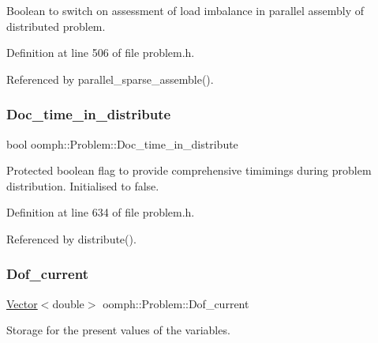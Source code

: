 Boolean to switch on assessment of load imbalance in parallel assembly of distributed problem. 



Definition at line 506 of file problem.\+h.



Referenced by parallel\+\_\+sparse\+\_\+assemble().

\mbox{\label{classoomph_1_1Problem_a524b68efcaae084ad7144f944cb39c69}} 
\subsubsection{\texorpdfstring{Doc\+\_\+time\+\_\+in\+\_\+distribute}{Doc\_time\_in\_distribute}}
{\footnotesize\ttfamily bool oomph\+::\+Problem\+::\+Doc\+\_\+time\+\_\+in\+\_\+distribute\hspace{0.3cm}{\ttfamily [protected]}}



Protected boolean flag to provide comprehensive timimings during problem distribution. Initialised to false. 



Definition at line 634 of file problem.\+h.



Referenced by distribute().

\mbox{\label{classoomph_1_1Problem_a366b50c490e9fd3ddafa05b2fbd0b883}} 
\subsubsection{\texorpdfstring{Dof\+\_\+current}{Dof\_current}}
{\footnotesize\ttfamily \hyperlink{classoomph_1_1Vector}{Vector}$<$double$>$ oomph\+::\+Problem\+::\+Dof\+\_\+current\hspace{0.3cm}{\ttfamily [protected]}}



Storage for the present values of the variables. 



